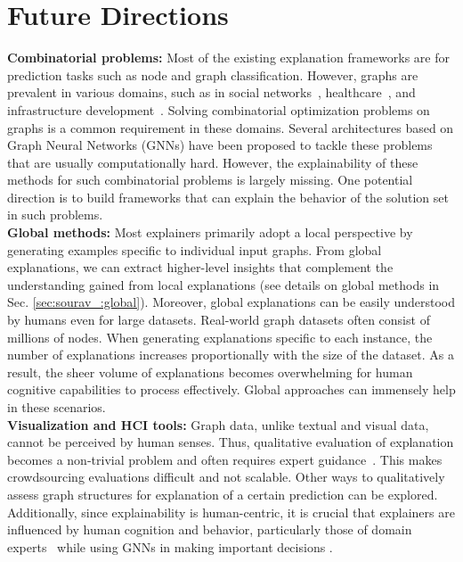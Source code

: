 \section{Future Directions}
\label{sec:sourav_future_work}

\textbf{Combinatorial problems: } Most of the existing explanation frameworks are for prediction tasks such as node and graph classification. However, graphs are prevalent in various domains, such as in social networks~\cite{kempe2003maximizing,medya2020approximate}, healthcare~\cite{wilder2018optimizing}, and infrastructure development~\cite{medya2018noticeable,medya2016towards}. Solving combinatorial optimization problems on graphs is a common requirement in these domains. Several architectures based on Graph Neural Networks (GNNs) \cite{khalil2017learning,manchanda2020gcomb,ranjan2022greed} have been proposed to tackle these problems that are usually computationally hard. However, the explainability of these methods for such combinatorial problems is largely missing. One potential direction is to build frameworks that can explain the behavior of the solution set in such problems. \\
\noindent 
\textbf{Global methods: } 
Most explainers primarily adopt a local perspective by generating examples specific to individual input graphs. From global explanations, we can extract higher-level insights that complement the understanding gained from local explanations (see details on global methods in Sec. \ref{sec:sourav_:global}). Moreover, global explanations can be easily understood by humans even for large datasets.
Real-world graph datasets often consist of millions of nodes. When generating explanations specific to each instance, the number of explanations increases proportionally with the size of the dataset. As a result, the sheer volume of explanations becomes overwhelming for human cognitive capabilities to process effectively. Global approaches can immensely help in these scenarios. \\
\noindent
\textbf{Visualization and HCI tools: } Graph data, unlike textual and visual data, cannot be perceived by human senses. Thus, qualitative evaluation of explanation becomes a non-trivial problem and often requires expert guidance~\cite{ying2019gnnexplainer,pgm-ex}. This makes crowdsourcing evaluations difficult and not scalable. Other ways to qualitatively assess graph structures for explanation of a certain prediction can be explored. Additionally, since explainability is human-centric, it is crucial that explainers are influenced by human cognition and behavior, particularly those of domain experts~\cite{liao2021human} while using GNNs in making important decisions \cite{medya2022exploratory}.
